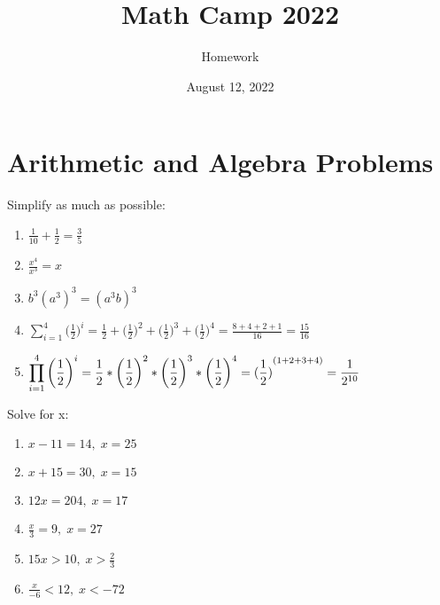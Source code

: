 \documentclass [12pt] {article}
\title{Math Camp 2022}
\author{Homework}
\date{August 12, 2022}
\begin{document}
\maketitle
\section{Arithmetic and Algebra Problems} 

Simplify as much as possible:

\begin{enumerate} 
	
	\item $\displaystyle\frac{1}{10} + \displaystyle\frac{1}{2} = \displaystyle\frac{3}{5}$
 
	
	\item $\displaystyle\frac{x^4}{x^3} = x$
	
	\item $b^3(a^3)^3 = (a^3b)^3$
    
    \item $\displaystyle\sum_{i=1}^{4}\bigg(\frac{1}{2}\bigg)^i 
    = \frac{1}{2} + \bigg(\frac{1}{2}\bigg)^2 +  \bigg(\frac{1}{2}\bigg)^3 + \bigg(\frac{1}{2}\bigg)^4 
    = \frac{8+4 + 2+1}{16}  =\frac{15}{16}$
    
    \item $\displaystyle\prod_{i=1}^{4}\bigg(\frac{1}{2}\bigg)^i = \frac{1}{2} * \bigg(\frac{1}{2}\bigg)^2 * \bigg(\frac{1}{2}\bigg)^3 * \bigg(\frac{1}{2}\bigg)^4 = {\displaystyle (\frac{1}{2})}  ^{\small(1+2+3+4)} =  \frac{1}{2^ {10}} $
	
\end{enumerate}

\vspace{12pt}
Solve for x: 

\begin{enumerate}
	\item $x-11 = 14, \;  x = 25$

	
	\item $x+15=30, \; x = 15$
	
	\item $12x=204 , \; x = 17$
	
	\item $\displaystyle\frac{x}{3}=9, \; x = 27 $

	\item $15x > 10 , \; x > {\displaystyle \frac{2}{3} }$
    
    \item $\displaystyle\frac{x}{-6} < 12 , \; x < -72$
\end{enumerate}
\end{document}
